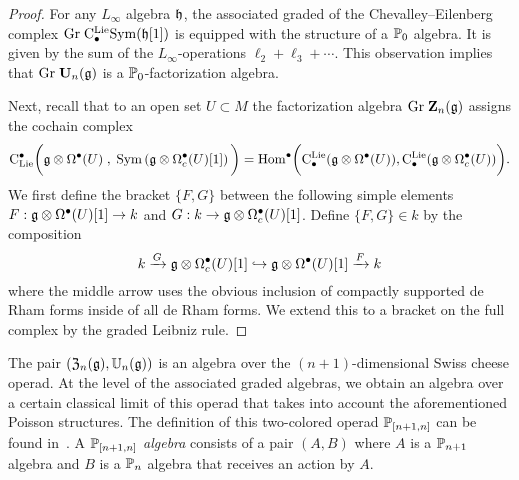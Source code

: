 \documentclass[11pt]{amsart}
\numberwithin{equation}{section}
\def\brian{\textcolor{blue}{BW: }\textcolor{blue}}
\begin{document}
\begin{proof}
For any $L_\infty$ algebra $\mathfrak h$, the associated graded of the Chevalley--Eilenberg complex ${\rm Gr} \; {\rm C}^{\rm Lie}_\bullet {\rm Sym} (\mathfrak h [1])$ is equipped with the structure of a $\mathbb P_0$ algebra.
It is given by the sum of the $L_\infty$-operations $\ell_2 + \ell_3 + \cdots$. 
This observation implies that ${\rm Gr} \; \mathbf U_n (\mathfrak g)$ is a $\mathbb P_0$-factorization algebra.

Next, recall that to an open set $U \subset M$ the factorization algebra ${\rm Gr} \; \mathbf Z_n (\mathfrak g)$ assigns the cochain complex
\[
{\rm C}_{{\rm Lie}}^\bullet\bigg(\mathfrak g \otimes \Omega^\bullet (U) \; , \; {\rm Sym} \left(\mathfrak g \otimes \Omega^\bullet_c(U) [1]\right) \bigg) = {\rm Hom}^\bullet \bigg({\rm C}^{\rm Lie}_\bullet(\mathfrak g \otimes \Omega^\bullet(U)) , {\rm C}^{\rm Lie}_\bullet (\mathfrak g \otimes \Omega^\bullet_c(U)) \bigg).
\]
We first define the bracket $\{F,G\}$ between the following simple elements $F : \mathfrak g \otimes \Omega^\bullet (U)[1] \to k$ and $G : k \to \mathfrak g \otimes \Omega^\bullet_c(U)[1]$. 
Define $\{F, G\} \in k$ by the composition
\[
k \xrightarrow{G} \mathfrak g \otimes \Omega^\bullet_c(U)[1] \hookrightarrow \mathfrak g \otimes \Omega^\bullet(U)[1] \xrightarrow{F} k
\]
where the middle arrow uses the obvious inclusion of compactly supported de Rham forms inside of all de Rham forms. 
We extend this to a bracket on the full complex by the graded Leibniz rule. 
\end{proof}

The pair $(\mathfrak Z_n(\mathfrak g), \mathbb U_n(\mathfrak g))$ is an algebra over the $(n+1)$-dimensional Swiss cheese operad. 
At the level of the associated graded algebras, 
we obtain an algebra over a certain classical limit of this operad that takes into account the aforementioned Poisson structures.
The definition of this two-colored operad $\mathbb P_{[n+1,n]}$ can be found in~\cite{SafronovCoiso}. 
A {\em $\mathbb P_{[n+1,n]}$ algebra} consists of a pair $(A,B)$ where $A$ is a $\mathbb P_{n+1}$ algebra and $B$ is a $\mathbb P_n$ algebra that receives an action by $A$. 
\end{document}
